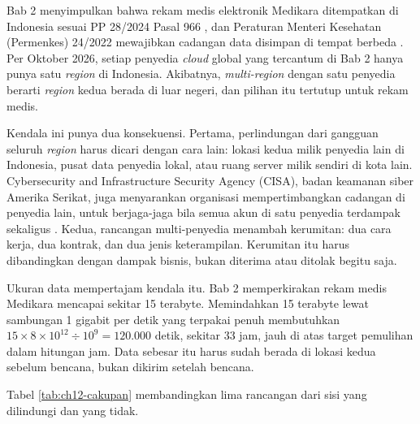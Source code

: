 Bab 2 menyimpulkan bahwa rekam medis elektronik Medikara ditempatkan di Indonesia sesuai PP 28/2024
Pasal 966 \cite{pp28-2024-kesehatan}, dan Peraturan Menteri Kesehatan (Permenkes) 24/2022 mewajibkan cadangan data disimpan di tempat
berbeda \cite{permenkes24-2022}. Per Oktober 2026, setiap penyedia \textit{cloud} global yang
tercantum di Bab 2 hanya punya satu \textit{region} di Indonesia. Akibatnya, \textit{multi-region}
dengan satu penyedia berarti \textit{region} kedua berada di luar negeri, dan pilihan itu tertutup
untuk rekam medis.

Kendala ini punya dua konsekuensi. Pertama, perlindungan dari gangguan seluruh \textit{region}
harus dicari dengan cara lain: lokasi kedua milik penyedia lain di Indonesia, pusat data penyedia
lokal, atau ruang server milik sendiri di kota lain. Cybersecurity and Infrastructure Security Agency
(CISA), badan keamanan siber Amerika Serikat, juga menyarankan organisasi mempertimbangkan cadangan
di penyedia lain, untuk berjaga-jaga bila semua akun di satu penyedia terdampak sekaligus
\cite{c12-cisa2023}. Kedua, rancangan multi-penyedia menambah kerumitan: dua cara kerja, dua
kontrak, dan dua jenis keterampilan. Kerumitan itu harus dibandingkan dengan dampak bisnis, bukan
diterima atau ditolak begitu saja.

Ukuran data mempertajam kendala itu. Bab 2 memperkirakan rekam medis Medikara mencapai sekitar 15
terabyte. Memindahkan 15 terabyte lewat sambungan 1 gigabit per detik yang terpakai penuh
membutuhkan $15 \times 8 \times 10^{12} \div 10^9 = 120.000$ detik, sekitar 33 jam, jauh di atas
target pemulihan dalam hitungan jam. Data sebesar itu harus sudah berada di lokasi kedua sebelum
bencana, bukan dikirim setelah bencana.

Tabel \ref{tab:ch12-cakupan} membandingkan lima rancangan dari sisi yang dilindungi dan yang tidak.


